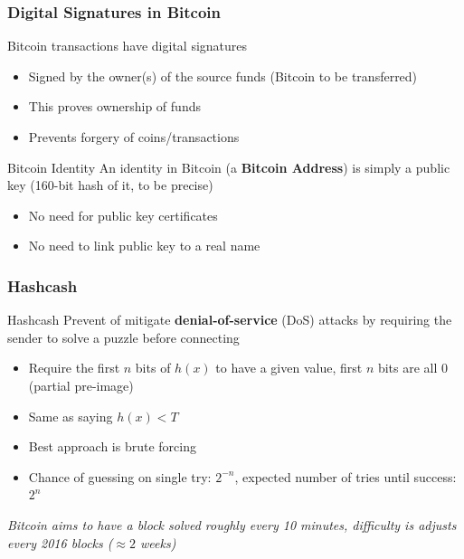 \subsubsection{Digital Signatures in Bitcoin}
Bitcoin transactions have digital signatures
\begin{itemize}
	\item Signed by the owner(s) of the source funds (Bitcoin to be transferred)
	\item This proves ownership of funds
	\item Prevents forgery of coins/transactions
\end{itemize}
\begin{note}{Bitcoin Identity}
	An identity in Bitcoin (a \textbf{Bitcoin Address}) is simply a public key (160-bit hash of it, to be precise)
	\begin{itemize}
		\item No need for public key certificates
		\item No need to link public key to a real name
	\end{itemize}
\end{note}

\subsubsection{Hashcash}
\begin{note}{Hashcash}
	Prevent of mitigate \textbf{denial-of-service} (DoS) attacks by requiring the sender to solve a puzzle before connecting
	\begin{sequencediagram}
		
	\end{sequencediagram}
\end{note}
\begin{itemize}
	\item Require the first $n$ bits of $h(x)$ to have a given value, first $n$ bits are all $0$ (partial pre-image)
	\item Same as saying $h(x) < T$
	\item Best approach is brute forcing
	\item Chance of guessing on single try: $2^{-n}$, expected number of tries until success: $2^n$
\end{itemize}
\textit{Bitcoin aims to have a block solved roughly every 10 minutes, difficulty is adjusts every 2016 blocks ($\approx2$ weeks)}

